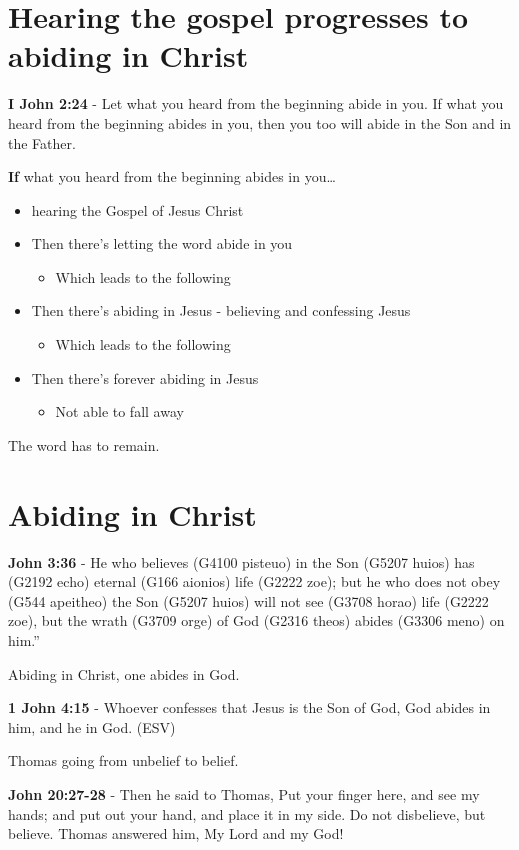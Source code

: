 \documentclass[11pt]{article}
\begin{document}
\section{Hearing the gospel progresses to abiding in Christ}
\label{sec:orgbebf475}
\textbf{I John 2:24} - Let what you heard from the beginning abide in you. If what you heard from the beginning abides in you, then you too will abide in the Son and in the Father.

\textbf{If} what you heard from the beginning abides in you\ldots{}

\begin{itemize}
\item hearing the Gospel of Jesus Christ
\item Then there's letting the word abide in you
\begin{itemize}
\item Which leads to the following
\end{itemize}
\item Then there's abiding in Jesus - believing and confessing Jesus
\begin{itemize}
\item Which leads to the following
\end{itemize}
\item Then there's forever abiding in Jesus
\begin{itemize}
\item Not able to fall away
\end{itemize}
\end{itemize}

The word has to remain.

\section{Abiding in Christ}
\label{sec:orgf4f629d}
\textbf{John 3:36} - He who believes (G4100 pisteuo) in the Son (G5207 huios) has (G2192 echo) eternal (G166 aionios) life (G2222 zoe); but he who does not obey (G544 apeitheo) the Son (G5207 huios) will not see (G3708 horao) life (G2222 zoe), but the wrath (G3709 orge) of God (G2316 theos) abides (G3306 meno) on him.”

Abiding in Christ, one abides in God.

\textbf{1 John 4:15} - Whoever confesses that Jesus is the Son of God, God abides in him, and he in God. (ESV)

Thomas going from unbelief to belief.

\textbf{John 20:27-28} - Then he said to Thomas, Put your finger here, and see my hands; and put out your hand, and place it in my side. Do not disbelieve, but believe. Thomas answered him, My Lord and my God!
\end{document}
